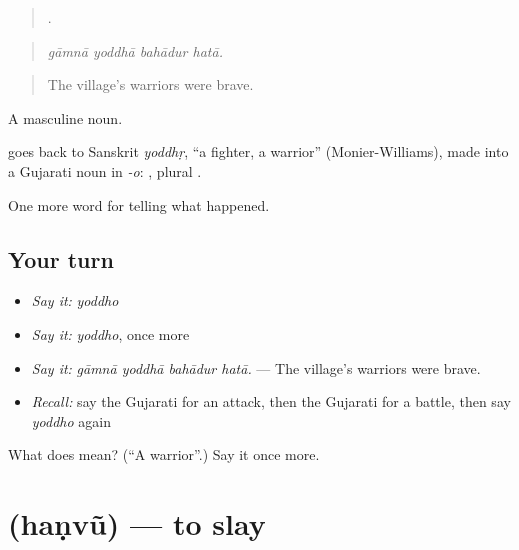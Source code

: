 \begin{quote}
   .
\end{quote}

\begin{quote}
\emph{gāmnā yoddhā bahādur hatā.}
\end{quote}

\begin{quote}
The village's warriors were brave.
\end{quote}

A masculine noun.

\begin{cousinweb}
goes back to Sanskrit \emph{yoddhṛ}, \textquotedblleft{}a fighter, a warrior\textquotedblright{} (Monier-Williams), made into a Gujarati noun in \emph{-o}: \textbf{}, plural \textbf{}.
\end{cousinweb}

\begin{grammarlens}[title={What you've built}]
One more word for telling what happened.
\end{grammarlens}

\subsection*{Your turn}
\begin{itemize}
\raggedright
  \item \emph{Say it:} \emph{yoddho}
  \item \emph{Say it:} \emph{yoddho}, once more
  \item \emph{Say it:} \emph{gāmnā yoddhā bahādur hatā.} — The village's warriors were brave.
  \item \emph{Recall:} say the Gujarati for an attack, then the Gujarati for a battle, then say \emph{yoddho} again
\end{itemize}

\begin{tcolorbox}[breakable,colback=teal!4,colframe=teal!35!black,title={Before you move on}]
What does  mean? (\textquotedblleft{}A warrior\textquotedblright{}.) Say it once more.
\end{tcolorbox}
\section[\texorpdfstring{\gu{હણવું} (haṇvũ)}{હણવું (haṇvũ)}]{ (haṇvũ) — to slay}

\label{lesson:GU-C322-hanvu}



